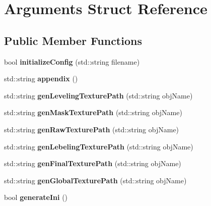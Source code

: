 \hypertarget{struct_arguments}{}\section{Arguments Struct Reference}
\label{struct_arguments}
\subsection*{Public Member Functions}
\begin{DoxyCompactItemize}
\item 
\hypertarget{struct_arguments_adb3df83131fa2be8783755b93c28c3de}{}bool {\bfseries initialize\+Config} (std\+::string filename)\label{struct_arguments_adb3df83131fa2be8783755b93c28c3de}

\item 
\hypertarget{struct_arguments_a693a6a2a4334f5e34b3eb5ed6a555b28}{}std\+::string {\bfseries appendix} ()\label{struct_arguments_a693a6a2a4334f5e34b3eb5ed6a555b28}

\item 
\hypertarget{struct_arguments_a84cff19e3bdd988ba096e1a81e747103}{}std\+::string {\bfseries gen\+Leveling\+Texture\+Path} (std\+::string obj\+Name)\label{struct_arguments_a84cff19e3bdd988ba096e1a81e747103}

\item 
\hypertarget{struct_arguments_acc8d0c6a9477669bee3d9fe79e0b6d6c}{}std\+::string {\bfseries gen\+Mask\+Texture\+Path} (std\+::string obj\+Name)\label{struct_arguments_acc8d0c6a9477669bee3d9fe79e0b6d6c}

\item 
\hypertarget{struct_arguments_af256b45e3009486a4ea5066f8b7a080f}{}std\+::string {\bfseries gen\+Raw\+Texture\+Path} (std\+::string obj\+Name)\label{struct_arguments_af256b45e3009486a4ea5066f8b7a080f}

\item 
\hypertarget{struct_arguments_ac2161fcafef758c6418e6d7113fedee2}{}std\+::string {\bfseries gen\+Lebeling\+Texture\+Path} (std\+::string obj\+Name)\label{struct_arguments_ac2161fcafef758c6418e6d7113fedee2}

\item 
\hypertarget{struct_arguments_ae4c2ab8514254a581f2124d4095ffe06}{}std\+::string {\bfseries gen\+Final\+Texture\+Path} (std\+::string obj\+Name)\label{struct_arguments_ae4c2ab8514254a581f2124d4095ffe06}

\item 
\hypertarget{struct_arguments_ab6012180dadee8fff0a7271aafd96089}{}std\+::string {\bfseries gen\+Global\+Texture\+Path} (std\+::string obj\+Name)\label{struct_arguments_ab6012180dadee8fff0a7271aafd96089}

\item 
\hypertarget{struct_arguments_a6db8fa82b73c39649ab151ef63085f0f}{}bool {\bfseries generate\+Ini} ()\label{struct_arguments_a6db8fa82b73c39649ab151ef63085f0f}

\end{DoxyCompactItemize}
